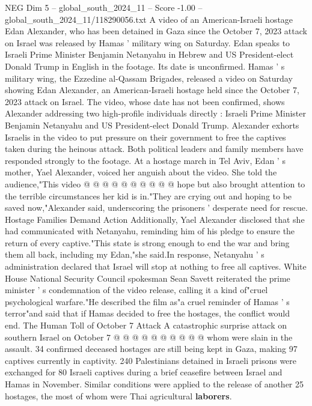 \begin{textsample}{NEG Dim 5 – global\_south\_2024\_11 – Score -1.00 – global\_south\_2024\_11/118290056.txt}  \label{ex:f5_neg_431}
A video of an American-Israeli hostage Edan Alexander, who has been detained in Gaza since the October 7, 2023 attack on Israel was released by Hamas ' military wing on Saturday.
Edan speaks to Israeli Prime Minister Benjamin Netanyahu in Hebrew and US President-elect Donald Trump in English in the footage.
Its date is unconfirmed.
Hamas ' s military wing, the Ezzedine al-Qassam Brigades, released a video on Saturday showing Edan Alexander, an American-Israeli hostage held since the October 7, 2023 attack on Israel.
The video, whose date has not been confirmed, shows Alexander addressing two high-profile individuals directly : Israeli Prime Minister Benjamin Netanyahu and US President-elect Donald Trump.
Alexander exhorts Israelis in the video to put pressure on their government to free the captives taken during the heinous attack.
Both political leaders and family members have responded strongly to the footage.
At a hostage march in Tel Aviv, Edan ' s mother, Yael Alexander, voiced her anguish about the video.
She told the audience,"This video @ @ @ @ @ @ @ @ @ @ hope but also brought attention to the terrible circumstances her kid is in."They are crying out and hoping to be saved now,"Alexander said, underscoring the prisoners ' desperate need for rescue.
Hostage Families Demand Action Additionally, Yael Alexander disclosed that she had communicated with Netanyahu, reminding him of his pledge to ensure the return of every captive."This state is strong enough to end the war and bring them all back, including my Edan,"she said.In response, Netanyahu ' s administration declared that Israel will stop at nothing to free all captives.
White House National Security Council spokesman Sean Savett reiterated the prime minister ' s condemnation of the video release, calling it a kind of"cruel psychological warfare."He described the film as"a cruel reminder of Hamas ' s terror"and said that if Hamas decided to free the hostages, the conflict would end.
The Human Toll of October 7 Attack A catastrophic surprise attack on southern Israel on October 7 @ @ @ @ @ @ @ @ @ @ whom were slain in the assault. 34 confirmed deceased hostages are still being kept in Gaza, making 97 captives currently in captivity. 240 Palestinians detained in Israeli prisons were exchanged for 80 Israeli captives during a brief ceasefire between Israel and Hamas in November.
Similar conditions were applied to the release of another 25 hostages, the most of whom were Thai agricultural \textbf{laborers}.

\end{textsample}
